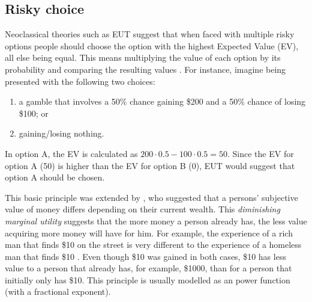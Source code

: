 \documentclass[a4paper, nobind, dvipsnames]{templates/ociamthesis}
\theoremstyle{definition}
\theoremstyle{definition}
\theoremstyle{definition}
\theoremstyle{definition}
\theoremstyle{remark}
\begin{document}
\subsection{Risky choice}

Neoclassical theories such as EUT suggest that when faced with multiple risky
options people should choose the option with the highest Expected Value (EV),
all else being equal. This means multiplying the value of each option by its
probability and comparing the resulting values \autocite[first documented in][]{pascal1999}. For instance, imagine being presented with the following two
choices:

\begin{enumerate}
\def\labelenumi{\Alph{enumi})}
\item
  a gamble that involves a 50\% chance gaining \$200 and a 50\% chance of losing
  \$100; or
\item
  gaining/losing nothing.
\end{enumerate}

In option A, the EV is calculated as \(200 \cdot 0.5 - 100 \cdot 0.5 = 50\). Since
the EV for option A (50) is higher than the EV for option B (0), EUT would
suggest that option A should be chosen.

This basic principle was extended by \textcite{bernoulli1954}, who suggested that a
persons' subjective value of money differs depending on their current wealth.
This \emph{diminishing marginal utility} suggests that the more money a person
already has, the less value acquiring more money will have for him. For example,
the experience of a rich man that finds \$10 on the street is very different to
the experience of a homeless man that finds \$10 \autocite{bradley2013}. Even though \$10
was gained in both cases, \$10 has less value to a person that already has, for
example, \$1000, than for a person that initially only has \$10. This principle is
usually modelled as an power function (with a fractional exponent).
\end{document}
